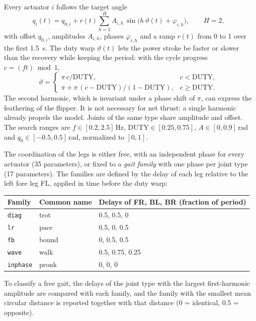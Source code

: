 Every actuator $i$ follows the target angle
\begin{equation}
  q_i(t) = q_{0,i} + r(t)\sum_{h=1}^{H} A_{i,h}\,\sin\!\big(h\,\vartheta(t)+\varphi_{i,h}\big), \qquad H=2,
  \label{eq:gait}
\end{equation}
with offset $q_{0,i}$, amplitudes $A_{i,h}$, phases $\varphi_{i,h}$ and a ramp $r(t)$ from 0 to 1 over the
first \SI{1.5}{\second}. The duty warp $\vartheta(t)$ lets the power stroke be faster or slower than the recovery
while keeping the period: with the cycle progress $c=(ft)\bmod1$,
\begin{equation}
  \vartheta = \begin{cases}
    \pi\,c/\mathrm{DUTY}, & c<\mathrm{DUTY},\\
    \pi + \pi\,(c-\mathrm{DUTY})/(1-\mathrm{DUTY}), & c\ge\mathrm{DUTY}.
  \end{cases}
  \label{eq:duty-warp}
\end{equation}
The second harmonic, which is invariant under a phase shift of $\pi$, can express the feathering of the
flipper. It is not necessary for net thrust: a single harmonic already propels the model. Joints of the same
type share amplitude and offset. The search ranges are $f\in[0.2,2.5]$\,Hz, $\mathrm{DUTY}\in[0.25,0.75]$,
$A\in[0,0.9]$\,rad and $q_0\in[-0.5,0.5]$\,rad, normalized to $[0,1]$.

The coordination of the legs is either free, with an independent phase for every actuator (35 parameters),
or fixed to a \emph{gait family} with one phase per joint type (17 parameters). The families are defined by
the delay of each leg relative to the left fore leg FL, applied in time before the duty warp:
\begin{center}
  \small
  \begin{tabular}{@{}lll@{}}
    \toprule
    Family & Common name & Delays of FR, BL, BR (fraction of period) \\
    \midrule
    \texttt{diag} & trot & 0.5, 0.5, 0 \\
    \texttt{lr} & pace & 0.5, 0, 0.5 \\
    \texttt{fb} & bound & 0, 0.5, 0.5 \\
    \texttt{wave} & walk & 0.5, 0.75, 0.25 \\
    \texttt{inphase} & pronk & 0, 0, 0 \\
    \bottomrule
  \end{tabular}
\end{center}
To classify a free gait, the delays of the joint type with the largest first-harmonic amplitude are compared
with each family, and the family with the smallest mean circular distance is reported together with that
distance (0 = identical, 0.5 = opposite).

